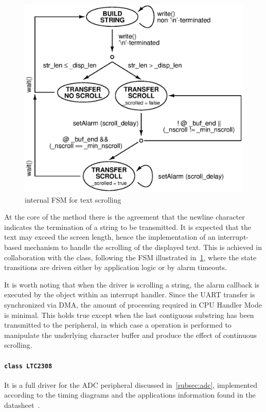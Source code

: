 \begin{figure}
    \centering
    \includegraphics[width=.6\linewidth]{../gfx/SSegDisplay_fsm.eps}
    \caption{ internal FSM for text scrolling}
    \label{fig:sseg_fsm}
\end{figure}

At the core of the  method there is the agreement that the newline character indicates the termination of a string to be transmitted. It is expected that the text may exceed the screen length, hence the implementation of an interrupt-based mechanism to handle the scrolling of the displayed text. This is achieved in collaboration with the  class, following the FSM illustrated in~\cref{fig:sseg_fsm}, where the state transitions are driven either by application logic or by alarm timeouts.

It is worth noting that when the driver is scrolling a string, the alarm callback is executed by the  object within an interrupt handler. Since the UART transfer is synchronized via DMA, the amount of processing required in CPU Handler Mode is minimal. This holds true except when the last contiguous substring has been transmitted to the peripheral, in which case a  operation is performed to manipulate the underlying character buffer and produce the effect of continuous scrolling.

\paragraph{\texttt{class LTC2308}}

It is a full driver for the ADC peripheral discussed in~\cref{subsec:adc}, implemented according to the timing diagrams and the applications information found in the datasheet~\cite{ltc2308}.

